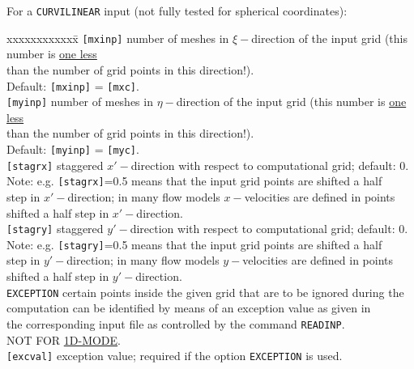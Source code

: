 \documentclass[12pt]{book}
\begin{document}
For a {\tt CURVILINEAR} input (not fully tested for spherical coordinates):
\begin{tabbing}
xxxxxxxxxxxx\= \kill
{\tt [mxinp]}       \> number of meshes in $\xi-$direction of the input grid (this number is \underline{one less}\+\\
                       than the number of grid points in this direction!).\\
                       Default: {\tt [mxinp]} = {\tt [mxc]}.\-\\
{\tt [myinp]}       \> number of meshes in $\eta-$direction of the input grid (this number is \underline{one less}\+\\
                       than the number of grid points in this direction!).\\
                       Default: {\tt [myinp]} = {\tt [myc]}.\-\\
{\tt [stagrx]}      \> staggered $x'-$direction with respect to computational grid; default: 0.\+\\
                       Note: e.g. {\tt [stagrx]}=0.5 means that the input grid points are shifted a half\\
                       step in $x'-$direction; in many flow models $x-$velocities are defined in points\\
                       shifted a half step in $x'-$direction.\-\\
{\tt [stagry]}      \> staggered $y'-$direction with respect to computational grid; default: 0.\+\\
                       Note: e.g. {\tt [stagry]}=0.5 means that the input grid points are shifted a half\\
                       step in $y'-$direction; in many flow models $y-$velocities are defined in points\\
                       shifted a half step in $y'-$direction.\-\\
{\tt EXCEPTION}     \> certain points inside the given grid that are to be ignored during the\+\\
                       computation can be identified by means of an exception value as given in\\
                       the corresponding input file as controlled by the command {\tt READINP}.\\
                       NOT FOR \underline{1D-MODE}.\-\\
{\tt [excval]}      \> exception value; required if the option {\tt EXCEPTION} is used.\+\\

\end{tabbing}
\end{document}
